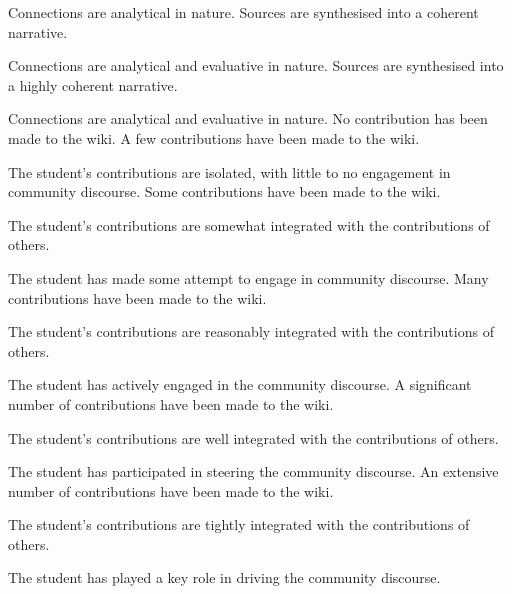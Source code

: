\documentclass{../../fal_assignment}
\begin{document}
\begin{markingrubric}
		\par		Connections are analytical in nature.
		\grade		Sources are synthesised into a coherent narrative.
		\par		Connections are analytical and evaluative in nature.
		\grade		Sources are synthesised into a highly coherent narrative.
		\par		Connections are analytical and evaluative in nature.
		\grade\fail 	No contribution has been made to the wiki.
		\grade 		A few contributions have been made to the wiki.
		\par		The student's contributions are isolated, with little to no engagement in community discourse.
		\grade 		Some contributions have been made to the wiki.
		\par		The student's contributions are somewhat integrated with the contributions of others.
		\par		The student has made some attempt to engage in community discourse.
		\grade 		Many contributions have been made to the wiki.
		\par		The student's contributions are reasonably integrated with the contributions of others.
		\par		The student has actively engaged in the community discourse.
		\grade 		A significant number of contributions have been made to the wiki.
		\par		The student's contributions are well integrated with the contributions of others.
		\par		The student has participated in steering the community discourse.
		\grade 		An extensive number of contributions have been made to the wiki.
		\par		The student's contributions are tightly integrated with the contributions of others.
		\par		The student has played a key role in driving the community discourse.
	\end{markingrubric}
	
\end{document}
